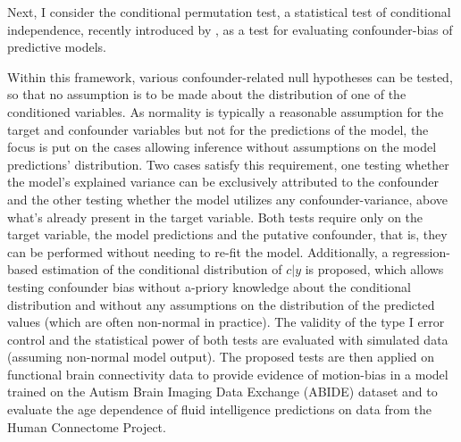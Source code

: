 \documentclass{article}
\begin{document}
Next, I consider the conditional permutation test, a statistical test of conditional independence, recently introduced by \cite{berrett2020conditional}, as a test for evaluating confounder-bias of predictive models.

Within this framework, various confounder-related null hypotheses can be tested, so that no assumption is to be made about the distribution of one of the conditioned variables. As normality is typically a reasonable assumption for the target and confounder variables but not for the predictions of the model, the focus is put on the cases allowing inference without assumptions on the model predictions' distribution.
Two cases satisfy this requirement, one testing whether the model's explained variance can be exclusively attributed to the confounder and the other testing whether the model utilizes any confounder-variance, above what's already present in the target variable.
Both tests require only on the target variable, the model predictions and the putative confounder, that is, they can be performed without needing to re-fit the model.
Additionally, a regression-based estimation of the conditional distribution of $c|y$ is proposed, which allows testing confounder bias without a-priory knowledge about the conditional distribution and without any assumptions on the distribution of the predicted values (which are often non-normal in practice).
The validity of the type I error control and the statistical power of both tests are evaluated with simulated data (assuming non-normal model output).
The proposed tests are then applied on functional brain connectivity data to provide evidence of motion-bias in a model trained on the Autism Brain Imaging Data Exchange (ABIDE) dataset \citep{di2014autism} and to evaluate the age dependence of fluid intelligence predictions on data from the Human Connectome Project.
\end{document}
